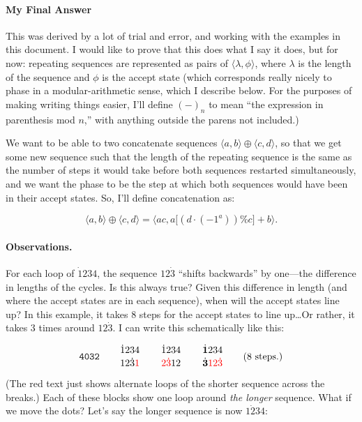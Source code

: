 \documentclass{article}
\begin{document}
\paragraph{My Final Answer} This was derived by a lot of trial and error,
 and working with the examples in this document. I would like to prove that this
 does what I say it does, but for now: repeating sequences are represented as
 pairs of $\langle \lambda, \phi \rangle$, where $\lambda$ is the length of
 the sequence and $\phi$ is the accept state (which corresponds really nicely
 to phase in a modular-arithmetic sense, which I describe below. For the
 purposes of making writing things easier, I'll define $(-)_n$ to mean ``the
 expression in parenthesis mod $n$,'' with anything outside the parens not
 included.)

 We want to be able to two concatenate sequences $\langle a, b \rangle \oplus
 \langle c, d \rangle$, so that we get some new sequence such that the
 length of the repeating sequence is the same as the number of steps it would
 take before both sequences restarted simultaneously, and we want the phase
 to be the step at which both sequences would have been in their accept
 states. So, I'll define concatenation as:

 \[
  \langle a, b \rangle \oplus \langle c, d \rangle =
  \langle ac, a \big[ (d \cdot (-1^a)) \% c \big] + b \rangle.
\]


\paragraph{Observations.} For each loop of $\dot{1}234$, the sequence $12\dot{3}$ ``shifts backwards'' by one---the difference in lengths of the cycles. Is this always true? \bullet{} Given this difference in length (and where the accept states are in each sequence), when will the accept states line up? \bullet{} In this example, it takes 8 steps for the accept states to line up\dots Or rather, it takes 3 times around $12\dot{3}$. I can write this schematically like this:

\[
  \texttt{4032} \qquad
  \SeqCompare{\dot{1}234}{12\dot{3}\textcolor{red}{1}} \qquad
  \SeqCompare{\dot{1}234}{\textcolor{red}{2\dot{3}}12} \qquad
  \SeqCompare{\dot{\mathbf{1}}234}{\dot{\mathbf{3}}\textcolor{red}{12\dot{3}}} \qquad
  \text{(8 steps.)}
\]

(The red text just shows alternate loops of the shorter sequence across the
breaks.) Each of these blocks show one loop around \emph{the longer} sequence. What if we move the dots? Let's say the longer sequence is now $1\dot{2}34$:
\end{document}
